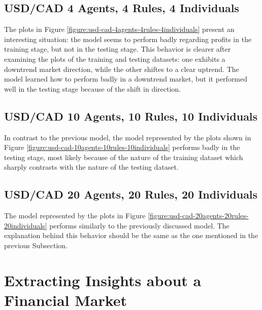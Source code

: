 \newpage

\subsection{USD/CAD 4 Agents, 4 Rules, 4 Individuals}
\label{results:forecast-usd-cad-4agents-4rules-4individuals}

The plots in Figure \ref{figure:usd-cad-4agents-4rules-4individuals} present an
interesting situation: the model seems to perform badly regarding profits in the
training stage, but not in the testing stage. This behavior is clearer after
examining the plots of the training and testing datasets: one exhibits a
downtrend market direction, while the other shiftes to a clear uptrend. The
model learned how to perform badly in a downtrend market, but it performed well
in the testing stage because of the shift in direction.



\newpage

\subsection{USD/CAD 10 Agents, 10 Rules, 10 Individuals}
\label{results:forecast-usd-cad-10agents-10rules-10individuals}

In contrast to the previous model, the model represented by the plots shown in
Figure \ref{figure:usd-cad-10agents-10rules-10individuals} performs badly in the
testing stage, most likely because of the nature of the training dataset which
sharply contrasts with the nature of the testing dataset.



\newpage

\subsection{USD/CAD 20 Agents, 20 Rules, 20 Individuals}
\label{results:forecast-usd-cad-20agents-20rules-20individuals}

The model represented by the plots in Figure
\ref{figure:usd-cad-20agents-20rules-20individuals} performs similarly to the
previously discussed model. The explanation behind this behavior should be the
same as the one mentioned in the previous Subsection.





\newpage

\section{Extracting Insights about a Financial Market}
\label{section:extracting-insights-about-a-financial-market}

